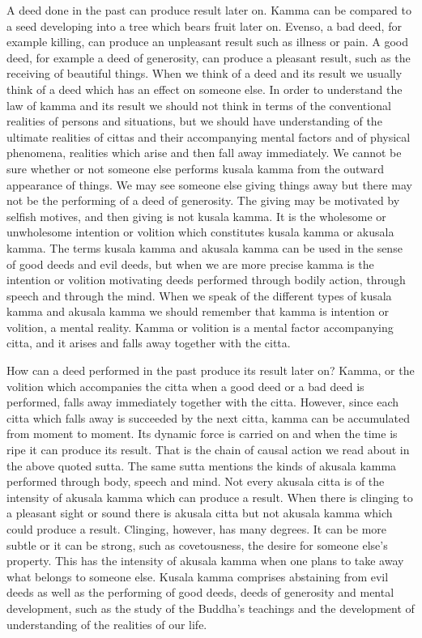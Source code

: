 \documentclass{book}
\begin{document}
A deed done in the past can produce result later on. Kamma can be
compared to a seed developing into a tree which bears fruit later on.
Evenso, a bad deed, for example killing, can produce an unpleasant
result such as illness or pain. A good deed, for example a deed of
generosity, can produce a pleasant result, such as the receiving of
beautiful things. When we think of a deed and its result we usually
think of a deed which has an effect on someone else. In order to
understand the law of kamma and its result we should not think in terms
of the conventional realities of persons and situations, but we should
have understanding of the ultimate realities of cittas and their
accompanying mental factors and of physical phenomena, realities which
arise and then fall away immediately. We cannot be sure whether or not 
someone else performs kusala kamma from the outward appearance of things.
We may see someone else giving things away but there may not be the
performing of a deed of generosity. The giving may be motivated by
selfish motives, and then giving is not kusala kamma. It is the
wholesome or unwholesome intention or volition which constitutes kusala
kamma or akusala kamma. The terms kusala kamma and akusala kamma can be
used in the sense of good deeds and evil deeds, but when we are more
precise kamma is the intention or volition motivating deeds performed
through bodily action, through speech and through the mind. When we
speak of the different types of kusala kamma and akusala kamma we should
remember that kamma is intention or volition, a mental reality. Kamma or volition is a mental factor accompanying citta, and it arises and falls away together with the citta.

How can a deed performed in the past produce its result later on? Kamma,
or the volition which accompanies the citta when a good deed or a bad
deed is performed, falls away immediately together with the citta.
However, since each citta which falls away is succeeded by the next
citta, kamma can be accumulated from moment to moment. Its dynamic force
is carried on and when the time is ripe it can produce its result. That
is the chain of causal action we read about in the above quoted sutta.
The same sutta mentions the kinds of akusala kamma performed through
body, speech and mind. Not every akusala citta is of the intensity of
akusala kamma which can produce a result. When there is clinging to a
pleasant sight or sound there is akusala citta but not akusala kamma
which could produce a result. Clinging, however, has many degrees. It
can be more subtle or it can be strong, such as covetous­ness, the
desire for someone else's property. This has the intensity of akusala
kamma when one plans to take away what belongs to someone else. Kusala
kamma comprises abstaining from evil deeds as well as the performing of
good deeds, deeds of generosity and mental development, such as the
study of the Buddha's teachings and the development of understanding of
the realities of our life.
\end{document}
